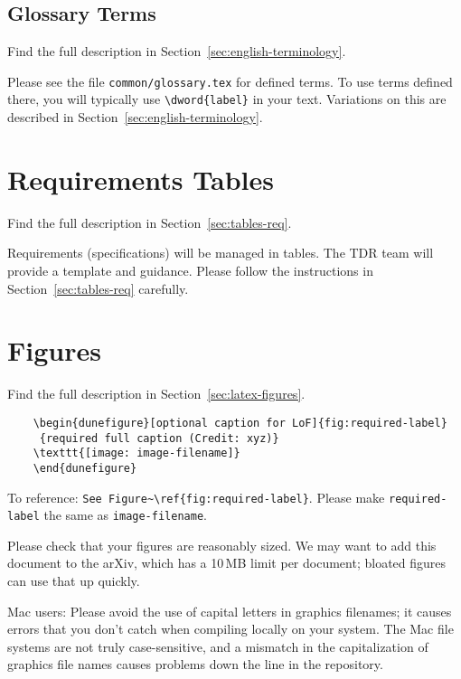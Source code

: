 \subsection{Glossary Terms}
\begin{framed}
Find the full description in Section~\ref{sec:english-terminology}.

Please see the file \verb|common/glossary.tex| for defined terms. To use terms defined there, you will typically use \verb|\dword{label}| in your text.  Variations on this are described in Section~\ref{sec:english-terminology}.
\end{framed}

\section{Requirements Tables}
\begin{framed}
Find the full description in Section~\ref{sec:tables-req}.

Requirements (specifications) will be managed in tables. The TDR team will provide a template and guidance.  Please follow the instructions in 
Section~\ref{sec:tables-req} carefully. 
\end{framed}

\section{Figures}
\begin{framed}
Find the full description in Section~\ref{sec:latex-figures}.
\begin{verbatim}
    \begin{dunefigure}[optional caption for LoF]{fig:required-label}
     {required full caption (Credit: xyz)}
    \texttt{[image: image-filename]}
    \end{dunefigure}
\end{verbatim}
To reference: \verb|See Figure~\ref{fig:required-label}|.
Please make \verb|required-label| the same as \verb|image-filename|. 

Please check that your figures are reasonably sized. We may want to add this document to the arXiv, which has a 10\,MB limit per document; bloated figures can use that up quickly. 

Mac users: Please avoid the use of capital letters in graphics filenames; it causes errors that you don't catch when compiling locally on your system. The Mac file systems are not truly case-sensitive, and a mismatch in the capitalization of graphics file names causes problems down the line in the repository.
\end{framed}

